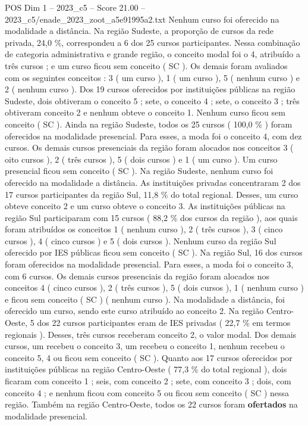 \begin{textsample}{POS Dim 1 – 2023\_c5 – Score 21.00 – 2023\_c5/enade\_2023\_zoot\_a5e91995a2.txt}
Nenhum curso foi oferecido na modalidade a distância.
Na região Sudeste, a proporção de cursos da rede privada, 24,0 \%, correspondeu a 6 dos 25 cursos participantes.
Nessa combinação de categoria administrativa e grande região, o conceito modal foi o 4, atribuído a três cursos ; e um curso ficou sem conceito ( SC ).
Os demais foram avaliados com os seguintes conceitos : 3 ( um curso ), 1 ( um curso ), 5 ( nenhum curso ) e 2 ( nenhum curso ).
Dos 19 cursos oferecidos por instituições públicas na região Sudeste, dois obtiveram o conceito 5 ; sete, o conceito 4 ; sete, o conceito 3 ; três obtiveram conceito 2 e nenhum obteve o conceito 1.
Nenhum curso ficou sem conceito ( SC ).
Ainda na região Sudeste, todos os 25 cursos ( 100,0 \% ) foram oferecidos na modalidade presencial.
Para esses, a moda foi o conceito 4, com dez cursos.
Os demais cursos presenciais da região foram alocados nos conceitos 3 ( oito cursos ), 2 ( três cursos ), 5 ( dois cursos ) e 1 ( um curso ).
Um curso presencial ficou sem conceito ( SC ).
Na região Sudeste, nenhum curso foi oferecido na modalidade a distância.
As instituições privadas concentraram 2 dos 17 cursos participantes da região Sul, 11,8 \% do total regional.
Desses, um curso obteve conceito 2 e um curso obteve o conceito 3.
As instituições públicas na região Sul participaram com 15 cursos ( 88,2 \% dos cursos da região ), aos quais foram atribuídos os conceitos 1 ( nenhum curso ), 2 ( três cursos ), 3 ( cinco cursos ), 4 ( cinco cursos ) e 5 ( dois cursos ).
Nenhum curso da região Sul oferecido por IES públicas ficou sem conceito ( SC ).
Na região Sul, 16 dos cursos foram oferecidos na modalidade presencial.
Para esses, a moda foi o conceito 3, com 6 cursos.
Os demais cursos presenciais da região foram alocados nos conceitos 4 ( cinco cursos ), 2 ( três cursos ), 5 ( dois cursos ), 1 ( nenhum curso ) e ficou sem conceito ( SC ) ( nenhum curso ).
Na modalidade a distância, foi oferecido um curso, sendo este curso atribuído ao conceito 2.
Na região Centro-Oeste, 5 dos 22 cursos participantes eram de IES privadas ( 22,7 \% em termos regionais ).
Desses, três cursos receberam conceito 2, o valor modal.
Dos demais cursos, um recebeu o conceito 3, um recebeu o conceito 1, nenhum recebeu o conceito 5, 4 ou ficou sem conceito ( SC ).
Quanto aos 17 cursos oferecidos por instituições públicas na região Centro-Oeste ( 77,3 \% do total regional ), dois ficaram com conceito 1 ; seis, com conceito 2 ; sete, com conceito 3 ; dois, com conceito 4 ; e nenhum ficou com conceito 5 ou ficou sem conceito ( SC ) nessa região.
Também na região Centro-Oeste, todos os 22 cursos foram \textbf{ofertados} na modalidade presencial.

\end{textsample}

